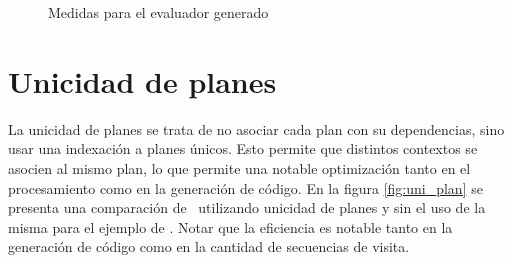 \begin{figure}[h!]
    
    \caption{\label{fug:med_eval_gen}Medidas para el evaluador generado}
    
\end{figure}

\section{Unicidad de planes}
La unicidad de planes se trata de no asociar cada plan con su dependencias, sino usar una indexación a planes únicos. Esto permite que distintos contextos se asocien al mismo plan, lo que permite una notable optimización tanto en el procesamiento como en la generación de código. En la figura \ref{fig:uni_plan} se presenta una comparación de \maggen\ utilizando unicidad de planes y sin el uso de la misma para el ejemplo de . Notar que la eficiencia es notable tanto en la generación de código como en la cantidad de secuencias de visita.

